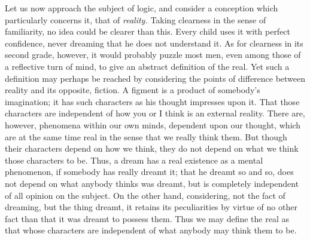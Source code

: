 \documentclass[]{article}
\begin{document}
Let us now approach the subject of logic, and consider a conception which particularly concerns it, that of \emph{reality.} Taking clearness in the sense of familiarity, no idea could be clearer than this. Every child uses it with perfect confidence, never dreaming that he does not understand it. As for clearness in its second grade, however, it would probably puzzle most men, even among those of a reflective turn of mind, to give an abstract definition of the real. Yet such a definition may perhaps be reached by considering the points of difference between reality and its opposite, fiction. A figment is a product of somebody's imagination; it has such characters as his thought impresses upon it. That those characters are independent of how you or I think is an external reality. There are, however, phenomena within our own minds, dependent upon our thought, which are at the same time real in the sense that we really think them. But though their characters depend on how we think, they do not depend on what we think those characters to be. Thus, a dream has a real existence as a mental phenomenon, if somebody has really dreamt it; that he dreamt so and so, does not depend on what anybody thinks was dreamt, but is completely independent of all opinion on the subject. On the other hand, considering, not the fact of dreaming, but the thing dreamt, it retains its peculiarities by virtue of no other fact than that it was dreamt to possess them. Thus we may define the real as that whose characters are independent of what anybody may think them to be. 
 
\end{document}
